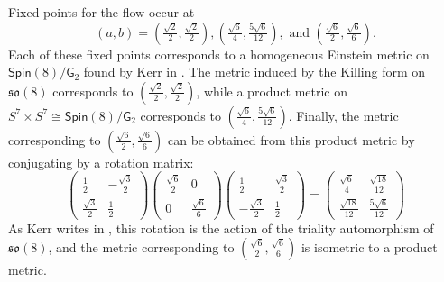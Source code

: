 \documentclass{amsart}
\numberwithin{equation}{section}
\theoremstyle{plain}
\theoremstyle{definition}
\theoremstyle{remark}
\numberwithin{table}{section}
\newcommand{\of}[1]{\left( #1 \right)}
\newcommand{\gG}{\mathsf{G}}
\newcommand{\Spin}{\mathsf{Spin}}
\newcommand{\so}{\mathfrak{so}}
\begin{document}
    Fixed points for the flow occur at 
    \begin{equation}\label{eq:sing_ab}
        (a,b) = \of{ \tfrac{\sqrt{2}}{2} , \tfrac{\sqrt{2}}{2} }, \of{ \tfrac{\sqrt{6}}{4} , \tfrac{5\sqrt{6}}{12} }, \text{ and } \of{ \tfrac{\sqrt{6}}{2} , \tfrac{\sqrt{6}}{6} }.
    \end{equation}
    Each of these fixed points corresponds to a homogeneous Einstein metric on $\Spin(8)/\gG_2$ found by Kerr in \cite{Kerr98}.
    The metric induced by the Killing form on $\so(8)$ corresponds to $( \frac{\sqrt{2}}{2} , \frac{\sqrt{2}}{2} )$, while a product metric on $S^7 \times S^7 \cong \Spin(8)/\gG_2$ corresponds to $( \frac{\sqrt{6}}{4} , \frac{5\sqrt{6}}{12} )$.
    Finally, the metric corresponding to $(\frac{\sqrt{6}}{2} , \frac{\sqrt{6}}{6} )$ can be obtained from this product metric by conjugating by a rotation matrix:
    \[
        \begin{pmatrix}
            \frac{1}{2}         & -\frac{\sqrt{3}}{2} \\
            \frac{\sqrt{3}}{2}  & \frac{1}{2}
        \end{pmatrix}
        \begin{pmatrix}
            \frac{\sqrt{6}}{2}  & 0 \\
            0                   & \frac{\sqrt{6}}{6}
        \end{pmatrix}
        \begin{pmatrix}
            \frac{1}{2}         & \frac{\sqrt{3}}{2} \\
            -\frac{\sqrt{3}}{2} & \frac{1}{2}
        \end{pmatrix}
        =
        \begin{pmatrix}
            \frac{\sqrt{6}}{4}      & \frac{\sqrt{18}}{12} \\
            \frac{\sqrt{18}}{12}    & \frac{5\sqrt{6}}{12}
        \end{pmatrix}        
    \]
    As Kerr writes in \cite{Kerr98}, this rotation is the action of the triality automorphism of $\so(8)$, and the metric corresponding to $( \frac{\sqrt{6}}{2} , \frac{\sqrt{6}}{6})$ is isometric to a product metric.
    

    
\end{document}
